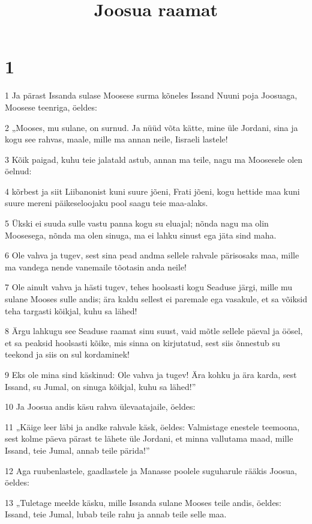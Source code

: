 

\title{Joosua raamat}

\chapter{1}

\par 1 Ja pärast Issanda sulase Moosese surma kõneles Issand Nuuni poja Joosuaga, Moosese teenriga, öeldes:
\par 2 „Mooses, mu sulane, on surnud. Ja nüüd võta kätte, mine üle Jordani, sina ja kogu see rahvas, maale, mille ma annan neile, Iisraeli lastele!
\par 3 Kõik paigad, kuhu teie jalatald astub, annan ma teile, nagu ma Moosesele olen öelnud:
\par 4 kõrbest ja siit Liibanonist kuni suure jõeni, Frati jõeni, kogu hettide maa kuni suure mereni päikeseloojaku pool saagu teie maa-alaks.
\par 5 Ükski ei suuda sulle vastu panna kogu su eluajal; nõnda nagu ma olin Moosesega, nõnda ma olen sinuga, ma ei lahku sinust ega jäta sind maha.
\par 6 Ole vahva ja tugev, sest sina pead andma sellele rahvale pärisosaks maa, mille ma vandega nende vanemaile tõotasin anda neile!
\par 7 Ole ainult vahva ja hästi tugev, tehes hoolsasti kogu Seaduse järgi, mille mu sulane Mooses sulle andis; ära kaldu sellest ei paremale ega vasakule, et sa võiksid teha targasti kõikjal, kuhu sa lähed!
\par 8 Ärgu lahkugu see Seaduse raamat sinu suust, vaid mõtle sellele päeval ja öösel, et sa peaksid hoolsasti kõike, mis sinna on kirjutatud, sest siis õnnestub su teekond ja siis on sul kordaminek!
\par 9 Eks ole mina sind käskinud: Ole vahva ja tugev! Ära kohku ja ära karda, sest Issand, su Jumal, on sinuga kõikjal, kuhu sa lähed!”
\par 10 Ja Joosua andis käsu rahva ülevaatajaile, öeldes:
\par 11 „Käige leer läbi ja andke rahvale käsk, öeldes: Valmistage enestele teemoona, sest kolme päeva pärast te lähete üle Jordani, et minna vallutama maad, mille Issand, teie Jumal, annab teile pärida!”
\par 12 Aga ruubenlastele, gaadlastele ja Manasse poolele suguharule rääkis Joosua, öeldes:
\par 13 „Tuletage meelde käsku, mille Issanda sulane Mooses teile andis, öeldes: Issand, teie Jumal, lubab teile rahu ja annab teile selle maa.
